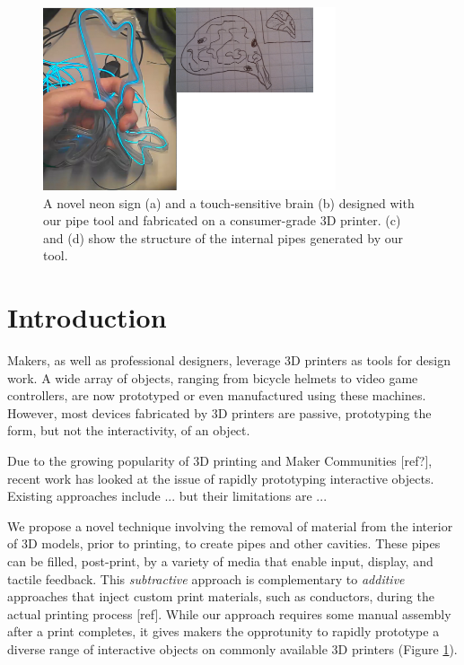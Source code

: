 \begin{figure}[h]
\centering
    \includegraphics[width=3.4in]{figures/placeholder/teaser.png}
\caption{A novel neon sign (a) and a touch-sensitive brain (b) designed with our pipe tool and fabricated on a consumer-grade 3D printer.  (c) and (d) show the structure of the internal pipes generated by our tool.   }
\label{fig:teaser}
\end{figure}

\section{Introduction}
Makers, as well as professional designers, leverage 3D printers as tools for design work.  A wide array of objects, ranging from bicycle helmets to video game controllers, are now prototyped or even manufactured using these machines.  However, most devices fabricated by 3D printers are passive, prototyping the form, but not the interactivity, of an object.  

Due to the growing popularity of 3D printing and Maker Communities [ref?], recent work has looked at the issue of rapidly prototyping interactive objects. Existing approaches include ... but their limitations are ...

We propose a novel technique involving the removal of material from the interior of 3D models, prior to printing, to create pipes and other cavities.  These pipes can be filled, post-print, by a variety of media that enable input, display, and tactile feedback.  This {\em subtractive} approach is complementary to {\em additive} approaches that inject custom print materials, such as conductors, during the actual printing process [ref]. While our approach requires some manual assembly after a print completes, it gives makers the opprotunity to rapidly prototype a diverse range of interactive objects on commonly available 3D printers (Figure \ref{fig:teaser}).

